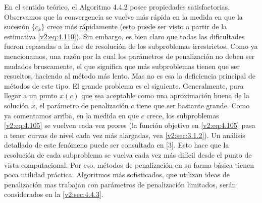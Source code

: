 En el sentido teórico, el Algoritmo 4.4.2 posee propiedades satisfactorias. Observamos que la convergencia se vuelve más rápida en la medida en que la sucesión $\{c_k\}$ crece más rápidamente (esto puede ser visto a partir de la estimativa \eqref{v2:eq:4.110}). Sin embargo, es bien claro que todas las dificultades fueron repasadas a la fase de resolución de los subproblemas irrestrictos. Como ya mencionamos, una razón por la cual los parámetros de penalización no deben ser mudados bruscamente, el que significa que más subproblemas tienen que ser resueltos, haciendo al método más lento. Mas no es esa la deficiencia principal de métodos de este tipo. El grande problema es el siguiente. Generalmente, para llegar a un punto $x(c)$ que sea aceptable como una aproximación buena de la solución $\bar{x}$, el parámetro de penalización $c$ tiene que ser bastante grande. Como ya comentamos arriba, en la medida en que $c$ crece, los subproblemas \eqref{v2:eq:4.105} se vuelven cada vez peores (la función objetivo en \eqref{v2:eq:4.105} pasa a tener curvas de nivel cada vez más alargadas, vea \cref{v2:sec:3.1.2}). Un análisis detallado de este fenómeno puede ser consultada en [3]. Esto hace que la resolución de cada subproblema se vuelva cada vez más difícil desde el punto de vista computacional. Por eso, métodos de penalización en su forma básica tienen poca utilidad práctica. Algoritmos más sofisticados, que utilizan ideas de penalización mas trabajan con parámetros de penalización limitados, serán considerados en la \cref{v2:sec:4.4.3}.